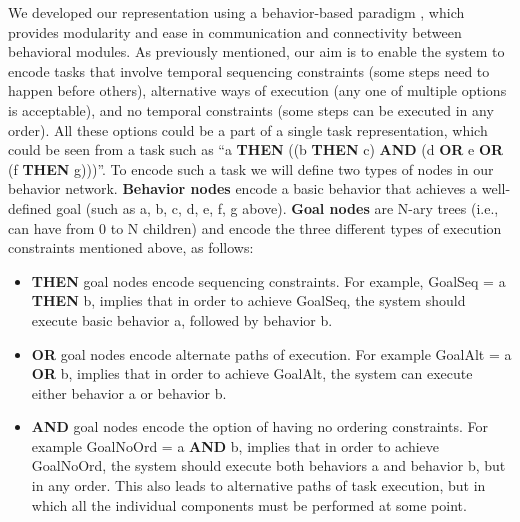 \documentclass[conference]{article}
\begin{document}
We developed our representation using a behavior-based paradigm \cite{arkin1998behavior}, which provides modularity and ease in communication and connectivity between behavioral modules.  As previously mentioned, our aim is to enable the system to encode tasks that involve temporal sequencing constraints (some steps need to happen before others), alternative ways of execution (any one of multiple options is acceptable), and no temporal constraints (some steps can be executed in any order). All these options could be a part of a single task representation, which could be seen from a task such as ``a {\bf THEN} ((b {\bf THEN} c) {\bf AND} (d {\bf OR} e {\bf OR} (f {\bf THEN} g)))''. To encode such a task we will define two types of nodes in our behavior network. {\bf Behavior nodes} encode a basic behavior that achieves a well-defined goal (such as a, b, c, d, e, f, g above). {\bf Goal nodes} are N-ary trees (i.e., can have from 0 to N children) and encode the three different types of execution constraints mentioned above, as follows:
\begin{itemize}

\item {\bf THEN} goal nodes encode sequencing constraints. For example, GoalSeq = a {\bf THEN} b, implies that in order to achieve GoalSeq, the system should execute basic behavior a, followed by behavior b.

\item {\bf OR} goal nodes encode alternate paths of execution. For example GoalAlt = a {\bf OR} b, implies that in order to achieve GoalAlt, the system can execute either behavior a or behavior b.

\item {\bf AND} goal nodes encode the option of having no ordering constraints. For example GoalNoOrd = a {\bf AND} b, implies that in order to achieve GoalNoOrd, the system should execute both behaviors a and behavior b, but in any order. This also leads to alternative paths of task execution, but in which all the individual components must be performed at some point.

\end{itemize}
\end{document}
